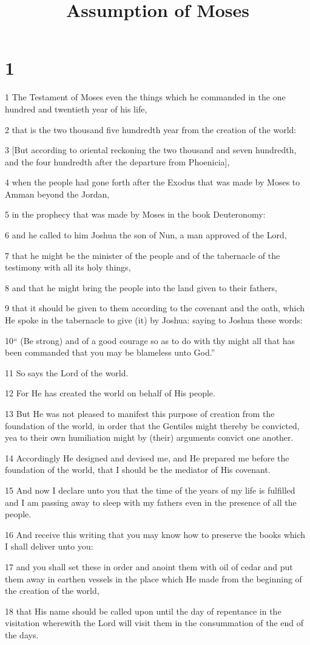 

\title{Assumption of Moses}

\chapter{1}

\par 1 The Testament of Moses even the things which he commanded in the one hundred and twentieth year of his life,
\par 2 that is the two thousand five hundredth year from the creation of the world:
\par 3 [But according to oriental reckoning the two thousand and seven hundredth, and the four hundredth after the departure from Phoenicia],
\par 4 when the people had gone forth after the Exodus that was made by Moses to Amman beyond the Jordan,
\par 5 in the prophecy that was made by Moses in the book Deuteronomy:
\par 6 and he called to him Joshua the son of Nun, a man approved of the Lord,
\par 7 that he might be the minister of the people and of the tabernacle of the testimony with all its holy things,
\par 8 and that he might bring the people into the land given to their fathers,
\par 9 that it should be given to them according to the covenant and the oath, which He spoke in the tabernacle to give (it) by Joshua: saying to Joshua these words:
\par 10“ (Be strong) and of a good courage so as to do with thy might all that has been commanded that you may be blameless unto God.”
\par 11 So says the Lord of the world.
\par 12 For He has created the world on behalf of His people.
\par 13 But He was not pleased to manifest this purpose of creation from the foundation of the world, in order that the Gentiles might thereby be convicted, yea to their own humiliation might by (their) arguments convict one another.
\par 14 Accordingly He designed and devised me, and He prepared me before the foundation of the world, that I should be the mediator of His covenant.
\par 15 And now I declare unto you that the time of the years of my life is fulfilled and I am passing away to sleep with my fathers even in the presence of all the people.
\par 16 And receive this writing that you may know how to preserve the books which I shall deliver unto you:
\par 17 and you shall set these in order and anoint them with oil of cedar and put them away in earthen vessels in the place which He made from the beginning of the creation of the world,
\par 18 that His name should be called upon until the day of repentance in the visitation wherewith the Lord will visit them in the consummation of the end of the days.

